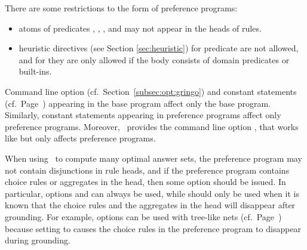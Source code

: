 \begin{note}
There are some restrictions to the form of preference programs: 
\begin{itemize}
\item 
atoms of predicates , , 
,  and 
may not appear in the heads of rules.%
\item
heuristic directives (see Section \ref{sec:heuristic}) for predicate  are not allowed, 
and for  they are only allowed if the body consists of domain predicates or built-ins.
\end{itemize}
\end{note}

\begin{note}
Command line option
 (cf.\ Section~\ref{subsec:opt:gringo}) 
and
constant statements (cf.\ Page~\pageref{subset:gringo:meta:const})
appearing in the base program
affect only the base program.
%
Similarly, 
constant statements appearing in preference programs affect only preference programs.
%
Moreover, \asprin\ provides the command line option ,
that works like  but only affects preference programs.
\end{note}

\begin{note}\label{asprin:note:meta}
When using \asprin\ to compute many optimal answer sets,
the preference program may not contain disjunctions in rule heads,
and if the preference program contains choice rules or aggregates in the head,
then some  option should be issued.
%
In particular, options  and  can always be used, 
while  should only be used when it is known that the choice rules 
and the aggregates in the head will disappear after grounding. 
%
For example, options  can be used with tree-like  nets
(cf.\ Page~\pageref{asprin:cp}) because setting  to 
causes the choice rules in the  preference program to disappear during grounding.
\end{note}

